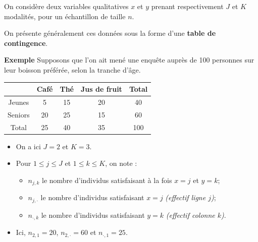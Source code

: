 \documentclass[aspectratio=169,xcolor=dvipsnames]{beamer}
\begin{document}
\begin{frame}
\begin{small}
\textcolor{nyubluedarker}{\faCogs} On considère deux variables qualitatives $x$ et $y$ prenant respectivement $J$ et $K$ modalités, pour un échantillon de taille $n$.

\textcolor{nyubluedarker}{\faLightbulb[regular]} On présente généralement ces données sous la forme d'une \textbf{table de contingence}.
\end{small}
	
	\begin{exampleblock}{\textbf{Exemple}}
	{\small Supposons que l'on ait mené une enquête auprès de 100 personnes sur leur boisson préférée, selon la tranche d'âge.}
\begin{scriptsize}
		\begin{center}
		\begin{tabular}{|c|c|c|c|c|}
		\hline
		\diagbox[height=0.5cm]{$x$ \ }{$y$} & Café & Thé & Jus de fruit & Total \\ \hline
		Jeunes & 5 & 15 & 20 & 40 \\ \hline
		Seniors & 20 & 25 & 15 & 60 \\ \hline
		Total & 25 & 40 & 35 & 100\\ \hline
		\end{tabular}
		\end{center}
		\begin{itemize}
		\item On a ici $J=2$ et $K=3$.
		\item Pour $1 \leqslant j \leqslant J$ et $1 \leqslant k \leqslant K$, on note :
			\begin{itemize}
			\item $n_{j,k}$ le nombre d'individus satisfaisant à la fois $x=j$ et $y=k$;
			\item $n_{j,\cdot}$ le nombre d'individus satisfaisant $x=j$ \emph{(effectif ligne $j$)};
			\item $n_{\cdot,k}$ le nombre d'individus satisfaisant $y=k$ \emph{(effectif colonne $k$)}.
			\end{itemize}
		\item Ici, $n_{2,1} = 20$, $n_{2,\cdot}=60$ et $n_{\cdot,1} =25$.
		\end{itemize}			

\end{scriptsize}
	\end{exampleblock}

\end{frame}
\end{document}
